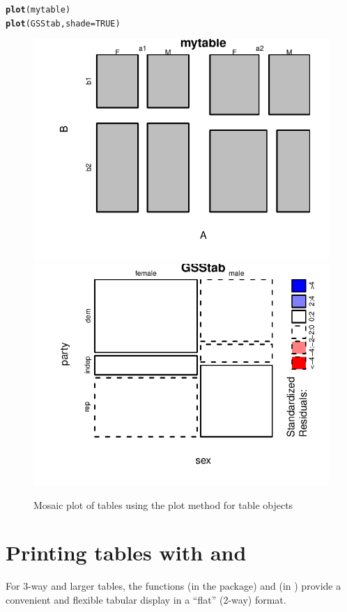 \documentclass[11pt]{book}\usepackage[]{graphicx}\usepackage[]{color}
\makeatletter
\newcommand{\hlnum}[1]{\textcolor[rgb]{0.686,0.059,0.569}{#1}}%
\newcommand{\hlstd}[1]{\textcolor[rgb]{0.345,0.345,0.345}{#1}}%
\newcommand{\hlkwc}[1]{\textcolor[rgb]{0.333,0.667,0.333}{#1}}%
\newcommand{\hlkwd}[1]{\textcolor[rgb]{0.737,0.353,0.396}{\textbf{#1}}}%
\newenvironment{kframe}{%
 \def\at@end@of@kframe{}%
 \ifinner\ifhmode%
  \def\at@end@of@kframe{\end{minipage}}%
  \begin{minipage}{\columnwidth}%
 \fi\fi%
 \def\FrameCommand##1{\hskip\@totalleftmargin \hskip-\fboxsep
 \colorbox{shadecolor}{##1}\hskip-\fboxsep
     \hskip-\linewidth \hskip-\@totalleftmargin \hskip\columnwidth}%
 \MakeFramed {\advance\hsize-\width
   \@totalleftmargin\z@ \linewidth\hsize
   \@setminipage}}%
 {\par\unskip\endMakeFramed%
 \at@end@of@kframe}
\newenvironment{knitrout}{}{} %
\renewenvironment{knitrout}{\small\renewcommand{\baselinestretch}{.85}}{} %
\makeatother
\begin{document}
\begin{knitrout}
\color{fgcolor}\begin{kframe}
\begin{alltt}
\hlkwd{plot}\hlstd{(mytable)}
\hlkwd{plot}\hlstd{(GSStab,} \hlkwc{shade}\hlstd{=}\hlnum{TRUE}\hlstd{)}
\end{alltt}
\end{kframe}\begin{figure}[htbp]


\centerline{\includegraphics[width=.48\textwidth]{ch02/fig/plot-xtab1} 
\includegraphics[width=.48\textwidth]{ch02/fig/plot-xtab2} }

\caption[Mosaic plot of tables using the plot method for table objects]{Mosaic plot of tables using the plot method for table objects\label{fig:plot-xtab}}
\end{figure}


\end{knitrout}




\section[Printing tables: structable and ftable]{Printing tables with  and }\label{sec:structable}

For 3-way and larger tables, the functions
 (in the  package) and
 (in ) provide a convenient and flexible tabular display in a ``flat'' (2-way) format.
\end{document}

